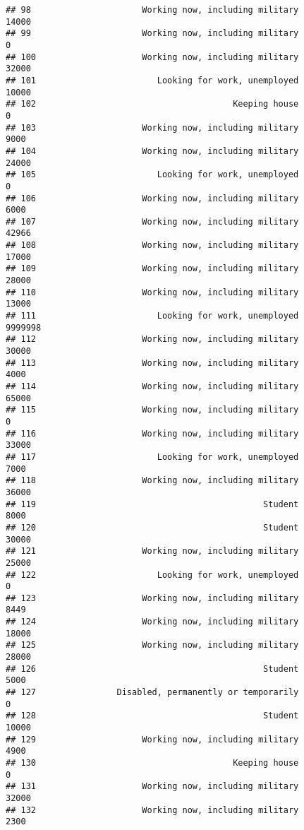 \documentclass[]{book}
\theoremstyle{definition}
\theoremstyle{definition}
\theoremstyle{remark}
\begin{document}
\begin{verbatim}
## 98                      Working now, including military           14000
## 99                      Working now, including military               0
## 100                     Working now, including military           32000
## 101                        Looking for work, unemployed           10000
## 102                                       Keeping house               0
## 103                     Working now, including military            9000
## 104                     Working now, including military           24000
## 105                        Looking for work, unemployed               0
## 106                     Working now, including military            6000
## 107                     Working now, including military           42966
## 108                     Working now, including military           17000
## 109                     Working now, including military           28000
## 110                     Working now, including military           13000
## 111                        Looking for work, unemployed         9999998
## 112                     Working now, including military           30000
## 113                     Working now, including military            4000
## 114                     Working now, including military           65000
## 115                     Working now, including military               0
## 116                     Working now, including military           33000
## 117                        Looking for work, unemployed            7000
## 118                     Working now, including military           36000
## 119                                             Student            8000
## 120                                             Student           30000
## 121                     Working now, including military           25000
## 122                        Looking for work, unemployed               0
## 123                     Working now, including military            8449
## 124                     Working now, including military           18000
## 125                     Working now, including military           28000
## 126                                             Student            5000
## 127                Disabled, permanently or temporarily               0
## 128                                             Student           10000
## 129                     Working now, including military            4900
## 130                                       Keeping house               0
## 131                     Working now, including military           32000
## 132                     Working now, including military            2300

\end{verbatim}
\end{document}
